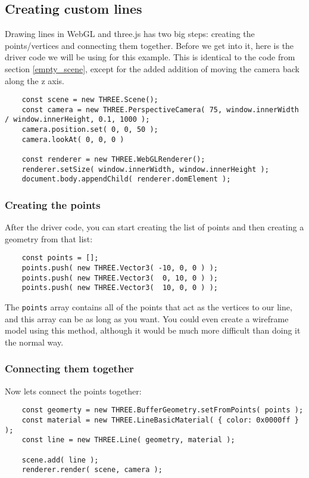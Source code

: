 \documentclass[10pt,final,journal,compsoc]{IEEEtran}
\begin{document}
    \subsection{Creating custom lines}
    Drawing lines in WebGL and three.js has two big steps: creating the points/vertices and connecting them together. Before we get into it, here is the driver code we will be using for this example. This is identical to the code from section \ref{empty_scene}, except for the added addition of moving the camera back along the z axis.
    
    \begin{lstlisting}
    const scene = new THREE.Scene();
    const camera = new THREE.PerspectiveCamera( 75, window.innerWidth / window.innerHeight, 0.1, 1000 );
    camera.position.set( 0, 0, 50 );
    camera.lookAt( 0, 0, 0 )
        
    const renderer = new THREE.WebGLRenderer();
    renderer.setSize( window.innerWidth, window.innerHeight );
    document.body.appendChild( renderer.domElement );
    \end{lstlisting}
    
        \subsubsection{Creating the points}
        After the driver code, you can start creating the list of points and then creating a geometry from that list:
        
        \begin{lstlisting}
    const points = [];
    points.push( new THREE.Vector3( -10, 0, 0 ) );
    points.push( new THREE.Vector3(  0, 10, 0 ) );
    points.push( new THREE.Vector3(  10, 0, 0 ) );
        \end{lstlisting}
        
        The \verb|points| array contains all of the points that act as the vertices to our line, and this array can be as long as you want. You could even create a wireframe model using this method, although it would be much more difficult than doing it the normal way.
        
        \subsubsection{Connecting them together}
        Now lets connect the points together:
        
        \begin{lstlisting}
    const geomerty = new THREE.BufferGeometry.setFromPoints( points );
    const material = new THREE.LineBasicMaterial( { color: 0x0000ff } );
    const line = new THREE.Line( geometry, material );
        
    scene.add( line );
    renderer.render( scene, camera );
        \end{lstlisting}
        
\end{document}
